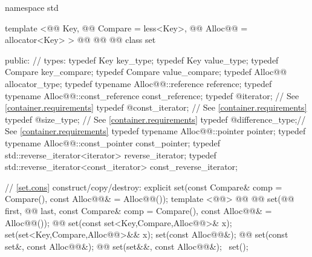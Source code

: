 \documentclass[american,twoside]{book}
\begin{document}
\begin{codeblock}
namespace std {
  template <@@ Key, @@ Compare = less<Key>,
            @@ Alloc@@ = allocator<Key> >
  @@
           @@
           @@
  class set {
  public:
    // types:
    typedef Key                                   key_type;
    typedef Key                                   value_type;
    typedef Compare                               key_compare;
    typedef Compare                               value_compare;
    typedef Alloc@@                             allocator_type;
    typedef typename Alloc@@::reference         reference;
    typedef typename Alloc@@::const_reference   const_reference;
    typedef @\impdef@                iterator;       // See \ref{container.requirements}
    typedef @\impdef@                const_iterator; // See \ref{container.requirements}
    typedef @\impdef@                size_type;      // See \ref{container.requirements}
    typedef @\impdef@                difference_type;// See \ref{container.requirements}
    typedef typename Alloc@@::pointer           pointer;
    typedef typename Alloc@@::const_pointer     const_pointer;
    typedef std::reverse_iterator<iterator>       reverse_iterator;
    typedef std::reverse_iterator<const_iterator> const_reverse_iterator;

    // \ref{set.cons} construct/copy/destroy:
    explicit set(const Compare& comp = Compare(),
                 const Alloc@@& = Alloc@@());
    template <@@>
      @@
            @@
      set(@@ first, @@ last,
          const Compare& comp = Compare(), const Alloc@@& = Alloc@@());
    @@ 
      set(const set<Key,Compare,Alloc@@>& x);
    set(set<Key,Compare,Alloc@@>&& x);
    set(const Alloc@@&);
    @@ 
      set(const set&, const Alloc@@&);
    @@
      set(set&&, const Alloc@@&);
   ~set();

}}
\end{codeblock}
\end{document}
